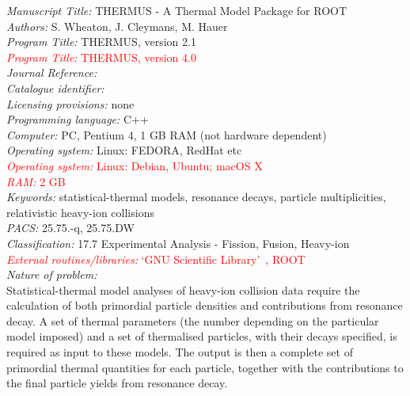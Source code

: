 \documentclass{elsarticle}
\newcounter{bla}
\begin{document}
\begin{small}
\noindent
{\em Manuscript Title:} THERMUS - A Thermal Model Package for ROOT				\\
{\em Authors:} S. Wheaton, J. Cleymans, M. Hauer								\\
{\em Program Title:} THERMUS, version 2.1									\\
\textcolor{red}{{\em Program Title:} THERMUS, version 4.0}						\\
{\em Journal Reference:}													\\
{\em Catalogue identifier:}													\\
{\em Licensing provisions:} none											\\
{\em Programming language:} C++											\\
{\em Computer:} PC, Pentium 4, 1 GB RAM (not hardware dependent)				\\
{\em Operating system:} Linux: FEDORA, RedHat etc							\\
\textcolor{red}{{\em Operating system:} Linux: Debian, Ubuntu; macOS X }			\\
\textcolor{red}{{\em RAM: } 2 GB }											\\
{\em Keywords:} statistical-thermal models, resonance decays, particle multiplicities, 
relativistic heavy-ion collisions												\\
{\em PACS:} 25.75.-q, 25.75.DW											\\
{\em Classification:} 17.7 Experimental Analysis - Fission, Fusion, Heavy-ion			\\
\textcolor{red}{{\em External routines/libraries:} `GNU Scientific Library'~\cite{galassi:2009gsl}, ROOT~\cite{Brun:1997pa}}	\\

{\em Nature of problem:}\\

Statistical-thermal model analyses of heavy-ion collision data require the
calculation of both primordial particle densities and contributions from 
resonance decay. A set of thermal parameters 
(the number depending on the particular model imposed) and a set of thermalised 
particles, with their decays specified, is required as input to these models. The 
output is then a complete set of primordial thermal quantities for each particle, 
together with the contributions to the final particle yields from resonance decay.\\ 


\end{small}
\end{document}
